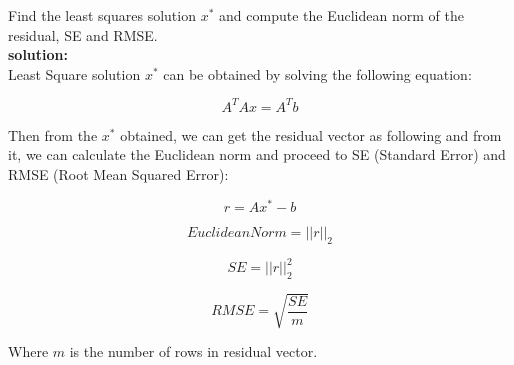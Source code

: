 \documentclass[unicode,11pt,a4paper,oneside,numbers=endperiod,openany]{scrartcl}
\newcommand{\norm}[1]{\lvert\lvert #1 \rvert\rvert}
\begin{document}
Find the least squares solution ${x^*}$ and compute the Euclidean norm of the residual, SE and RMSE. \\

\textbf{solution:} \\
Least Square solution ${x^*}$ can be obtained by solving the following equation:

\vspace{20px}

\begin{equation}
 A^TAx = A^Tb
\end{equation}

\vspace{20px}

Then from the ${x^*}$ obtained, we can get the residual vector as following and from it, we can calculate the Euclidean norm and proceed to SE (Standard Error) and RMSE (Root Mean Squared Error):

\vspace{20px}

\begin{equation}
 r = Ax^* - b
\end{equation}

\vspace{20px}

\begin{equation}
 Euclidean Norm = \norm{r}_2
\end{equation}

\vspace{20px}

\begin{equation}
 SE = \norm{r}_2^2
\end{equation}

\vspace{20px}

\begin{equation}
 RMSE = \sqrt{\frac{SE}{m}}
\end{equation}

\vspace{20px}

Where ${m}$ is the number of rows in residual vector. \\
\end{document}
